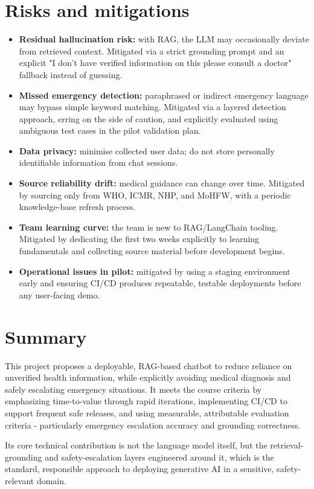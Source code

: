 \documentclass[11pt,a4paper]{article}
\begin{document}
\section{Risks and mitigations}
\begin{itemize}
    \item \textbf{Residual hallucination risk:} with RAG, the LLM may occasionally deviate from retrieved context. Mitigated via a strict grounding prompt and an explicit "I don't have verified information on this please consult a doctor" fallback instead of guessing.
    \item \textbf{Missed emergency detection:} paraphrased or indirect emergency language may bypass simple keyword matching. Mitigated via a layered detection approach, erring on the side of caution, and explicitly evaluated using ambiguous test cases in the pilot validation plan.
    \item \textbf{Data privacy:} minimise collected user data; do not store personally identifiable information from chat sessions.
    \item \textbf{Source reliability drift:} medical guidance can change over time. Mitigated by sourcing only from WHO, ICMR, NHP, and MoHFW, with a periodic knowledge-base refresh process.
    \item \textbf{Team learning curve:} the team is new to RAG/LangChain tooling. Mitigated by dedicating the first two weeks explicitly to learning fundamentals and collecting source material before development begins.
    \item \textbf{Operational issues in pilot:} mitigated by using a staging environment early and ensuring CI/CD produces repeatable, testable deployments before any user-facing demo.
\end{itemize}

\section{Summary}
This project proposes a deployable, RAG-based chatbot to reduce reliance on unverified health information, while explicitly avoiding medical diagnosis and safely escalating emergency situations. It meets the course criteria by emphasizing time-to-value through rapid iterations, implementing CI/CD to support frequent safe releases, and using measurable, attributable evaluation criteria - particularly emergency escalation accuracy and grounding correctness.

Its core technical contribution is not the language model itself, but the retrieval-grounding and safety-escalation layers engineered around it, which is the standard, responsible approach to deploying generative AI in a sensitive, safety-relevant domain.
\end{document}
